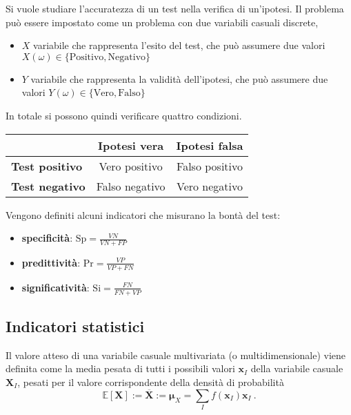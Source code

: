 \begin{example} Si vuole studiare l'accuratezza di un test nella verifica di un'ipotesi. Il problema può essere impostato come un problema con due variabili casuali discrete, 
    \begin{itemize}
        \item $X$ variabile che rappresenta l'esito del test, che può assumere due valori $X(\omega) \in \{ \text{Positivo}, \text{Negativo} \}$
        \item $Y$ variabile che rappresenta la validità dell'ipotesi, che può assumere due valori $Y(\omega) \in \{ \text{Vero}, \text{Falso} \}$
    \end{itemize}
    In totale si possono quindi verificare quattro condizioni.
    \FloatBarrier
    \begin{table}[H]
    \centering
    \begin{tabular}{|l|c|c|}
        \hline
                                  & \textbf{Ipotesi vera}   & \textbf{Ipotesi falsa}  \\
        \hline
         \textbf{Test positivo}   & Vero positivo           & Falso positivo          \\
        \hline
         \textbf{Test negativo}   & Falso negativo          & Vero negativo           \\
        \hline
    \end{tabular}
    \end{table}
    \FloatBarrier
    Vengono definiti alcuni indicatori che misurano la bontà del test:
    \begin{itemize}
        \item \textbf{specificità}: $\text{Sp} = \frac{VN}{VN+FP}$
        \item \textbf{predittività}: $\text{Pr} = \frac{VP}{VP+FN}$
        \item \textbf{significatività}: $\text{Si} = \frac{FN}{FN+VP}$
    \end{itemize}
\end{example}
\begin{example}
\end{example}
\subsection{Indicatori statistici}
\begin{definition}
Il valore atteso di una variabile casuale multivariata (o multidimensionale) viene definita come la media pesata di tutti i possibili valori $\mathbf{x}_I$ della variabile casuale $\mathbf{X}_I$, pesati per il valore corrispondente della densità di probabilità
\begin{equation}
    \mathbb{E}[\mathbf{X}] := \overline{\mathbf{X}} := \boldsymbol{\mu}_X = \sum_{I} f(\mathbf{x}_I) \mathbf{x}_I \ . 
\end{equation}
\end{definition}

